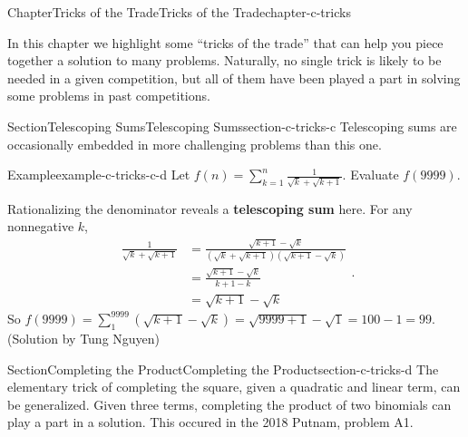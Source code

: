 \documentclass[oneside,10pt,]{book}
\newcommand{\terminology}[1]{\textbf{#1}}
\numberwithin{equation}{section}
\begin{document}
\begin{chapterptx}{Chapter}{Tricks of the Trade}{}{Tricks of the Trade}{}{}{chapter-c-tricks}
\renewcommand*{\chaptername}{Chapter}
\begin{introduction}{}%
In this chapter we highlight some ``tricks of the trade'' that can help you piece together a solution to many problems.  Naturally, no single trick is likely to be needed in a given competition, but all of them have been played a part in solving some problems in past competitions.%
\end{introduction}%
%
%
\typeout{************************************************}
\typeout{************************************************}
%
\begin{sectionptx}{Section}{Telescoping Sums}{}{Telescoping Sums}{}{}{section-c-tricks-c}
%
Telescoping sums are occasionally embedded in more challenging problems than this one.%
\begin{example}{Example}{}{example-c-tricks-c-d}%
%
Let \(f(n)=\sum_{k=1}^n \frac{1}{\sqrt{k}+\sqrt{k+1}}\).  Evaluate \(f(9999)\).%
\par
Rationalizing the denominator reveals a \terminology{telescoping sum} here.  For any nonnegative \(k\),%
\begin{equation*}
\begin{split}
\frac{1}{\sqrt{k} + \sqrt{k + 1}} & = \frac{\sqrt{k + 1} - \sqrt{k}}{(\sqrt{k} + \sqrt{k + 1})(\sqrt{k + 1} - \sqrt{k})}\\ 
&= \frac{\sqrt{k + 1} - \sqrt{k}}{k + 1 - k}\\
&= \sqrt{k + 1} - \sqrt{k}
\end{split}\text{.}
\end{equation*}
So \(f(9999) = \sum_{1}^{9999}(\sqrt{k + 1} - \sqrt{k}) = \sqrt{9999 + 1} - \sqrt{1} = 100 - 1 = 99\).  (Solution by Tung Nguyen)%
\end{example}
\end{sectionptx}
%
%
\typeout{************************************************}
\typeout{************************************************}
%
\begin{sectionptx}{Section}{Completing the Product}{}{Completing the Product}{}{}{section-c-tricks-d}
The elementary trick of completing the square, given a quadratic and linear term, can be generalized.  Given three terms, completing the product of two binomials can play a part in a solution.  This occured in the 2018 Putnam, problem A1.%

\end{sectionptx}
\end{chapterptx}
\end{document}
